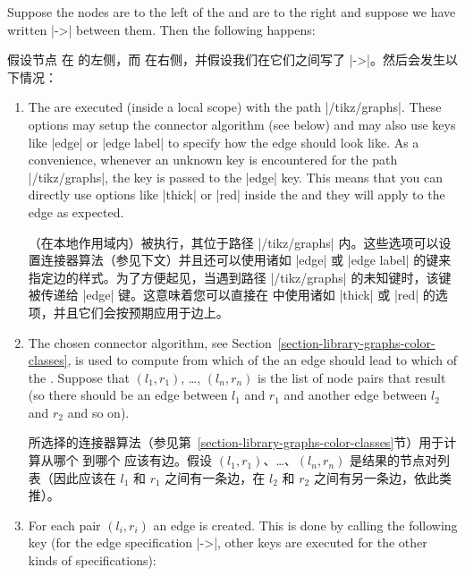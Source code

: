 Suppose the nodes  are to the left of the  and  are to the right and suppose we have
written |->| between them. Then the following happens:

假设节点  在  的左侧，而  在右侧，并假设我们在它们之间写了 |->|。然后会发生以下情况：

%
\begin{enumerate}
    \item The  are executed (inside a local scope) with the path
        |/tikz/graphs|.  These options may setup the connector algorithm (see
        below) and may also use keys like |edge| or |edge label| to specify how
        the edge should look like. As a convenience, whenever an unknown key is
        encountered for the path |/tikz/graphs|, the key is passed to the
        |edge| key. This means that you can directly use options like |thick|
        or |red| inside the  and they will apply to the edge as
        expected.

        （在本地作用域内）被执行，其位于路径 |/tikz/graphs| 内。这些选项可以设置连接器算法（参见下文）并且还可以使用诸如 |edge| 或 |edge label| 的键来指定边的样式。为了方便起见，当遇到路径 |/tikz/graphs| 的未知键时，该键被传递给 |edge| 键。这意味着您可以直接在  中使用诸如 |thick| 或 |red| 的选项，并且它们会按预期应用于边上。


    \item The chosen connector algorithm, see
        Section~\ref{section-library-graphs-color-classes}, is used to compute
        from which of the  an edge should lead to which of the
        . Suppose that $(l_1,r_1)$, \dots, $(l_n,r_n)$ is the
        list of node pairs that result (so there should be an edge between
        $l_1$ and $r_1$ and another edge between $l_2$ and $r_2$ and so on).

        所选择的连接器算法（参见第~\ref{section-library-graphs-color-classes}节）用于计算从哪个  到哪个  应该有边。假设 $(l_1,r_1)$、\dots、$(l_n,r_n)$ 是结果的节点对列表（因此应该在 $l_1$ 和 $r_1$ 之间有一条边，在 $l_2$ 和 $r_2$ 之间有另一条边，依此类推）。


    \item For each pair $(l_i,r_i)$ an edge is created. This is done by calling
        the following key (for the edge specification |->|, other keys are
        executed for the other kinds of specifications):
        

\end{enumerate}
